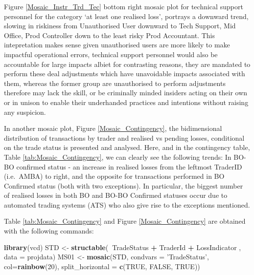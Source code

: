 \documentclass[]{DissertateUSU}
\newenvironment{Shaded}{\begin{snugshade}}{\end{snugshade}}
\newcommand{\KeywordTok}[1]{\textcolor[rgb]{0.13,0.29,0.53}{\textbf{#1}}}
\newcommand{\DataTypeTok}[1]{\textcolor[rgb]{0.13,0.29,0.53}{#1}}
\newcommand{\DecValTok}[1]{\textcolor[rgb]{0.00,0.00,0.81}{#1}}
\newcommand{\StringTok}[1]{\textcolor[rgb]{0.31,0.60,0.02}{#1}}
\newcommand{\OtherTok}[1]{\textcolor[rgb]{0.56,0.35,0.01}{#1}}
\newcommand{\OperatorTok}[1]{\textcolor[rgb]{0.81,0.36,0.00}{\textbf{#1}}}
\newcommand{\NormalTok}[1]{#1}
\begin{document}
Figure \ref{Mosaic_Instr_Trd_Tec} bottom right mosaic plot for technical
support personnel for the category `at least one realised loss',
portrays a downward trend, slowing in riskiness from Unauthorised User
downward to Tech Support, Mid Office, Prod Controller down to the least
risky Prod Accountant. This intepretation makes sense given unauthorised
users are more likely to make impactful operational errors, technical
support personnel would also be accountable for large impacts albiet for
contrasting reasons, they are mandated to perform these deal adjustments
which have unavoidable impacts associated with them, whereas the former
group are unauthorised to perform adjustments therefore may lack the
skill, or be criminally minded insiders acting on their own or in unison
to enable their underhanded practices and intentions without raising any
suspicion.\medskip   

In another mosaic plot, Figure \ref{Mosaic_Contingency}, the
bidimensional distribution of transactions by trader and realised vs
pending losses, conditional on the trade status is presented and
analysed. Here, and in the contingency table, Table
\ref{tab:Mosaic_Contingency}, we can clearly see the following trends:
In BO-BO confirmed status - an increase in realised losses from the
leftmost TraderID (i.e.~AMBA) to right, and the opposite for
transactions performed in BO Confirmed status (both with two
exceptions). In particular, the biggest number of realised losses in
both BO and BO-BO Confirmed statuses occur due to automated trading
systems (ATS) who also give rise to the exceptions mentioned.\medskip

Table \ref{tab:Mosaic_Contingency} and Figure \ref{Mosaic_Contingency}
are obtained with the following commands:

\singlespacing

\begin{Shaded}
\begin{Highlighting}[]
\KeywordTok{library}\NormalTok{(vcd)}
\NormalTok{STD <-}\StringTok{ }\KeywordTok{structable}\NormalTok{(}\OperatorTok{~}\NormalTok{TradeStatus }\OperatorTok{+}\StringTok{ }\NormalTok{TraderId }\OperatorTok{+}\StringTok{ }\NormalTok{LossIndicator}
\NormalTok{                                        , }\DataTypeTok{data =}\NormalTok{ projdata)}
\NormalTok{MS01 <-}\StringTok{ }\KeywordTok{mosaic}\NormalTok{(STD, }\DataTypeTok{condvars =} \StringTok{'TradeStatus'}\NormalTok{, }\DataTypeTok{col=}\KeywordTok{rainbow}\NormalTok{(}\DecValTok{20}\NormalTok{),}
                  \DataTypeTok{split_horizontal =} \KeywordTok{c}\NormalTok{(}\OtherTok{TRUE}\NormalTok{, }\OtherTok{FALSE}\NormalTok{, }\OtherTok{TRUE}\NormalTok{))}
\end{Highlighting}
\end{Shaded}
\end{document}
